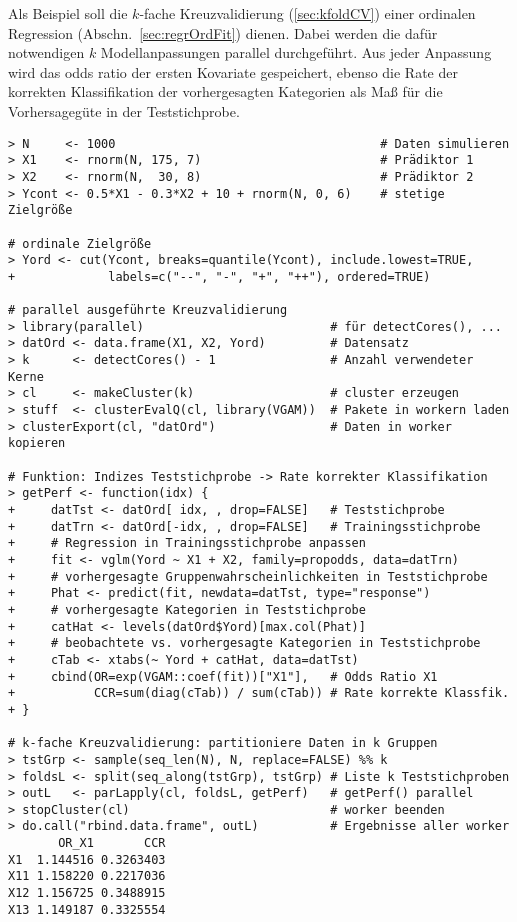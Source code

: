 Als Beispiel soll die $k$-fache Kreuzvalidierung (\ref{sec:kfoldCV}) einer ordinalen Regression (Abschn.\ \ref{sec:regrOrdFit}) dienen. Dabei werden die dafür notwendigen $k$ Modellanpassungen parallel durchgeführt. Aus jeder Anpassung wird das odds ratio der ersten Kovariate gespeichert, ebenso die Rate der korrekten Klassifikation der vorhergesagten Kategorien als Maß für die Vorhersagegüte in der Teststichprobe.
\begin{lstlisting}
> N     <- 1000                                     # Daten simulieren
> X1    <- rnorm(N, 175, 7)                         # Prädiktor 1
> X2    <- rnorm(N,  30, 8)                         # Prädiktor 2
> Ycont <- 0.5*X1 - 0.3*X2 + 10 + rnorm(N, 0, 6)    # stetige Zielgröße

# ordinale Zielgröße
> Yord <- cut(Ycont, breaks=quantile(Ycont), include.lowest=TRUE,
+             labels=c("--", "-", "+", "++"), ordered=TRUE)

# parallel ausgeführte Kreuzvalidierung
> library(parallel)                          # für detectCores(), ...
> datOrd <- data.frame(X1, X2, Yord)         # Datensatz
> k      <- detectCores() - 1                # Anzahl verwendeter Kerne
> cl     <- makeCluster(k)                   # cluster erzeugen
> stuff  <- clusterEvalQ(cl, library(VGAM))  # Pakete in workern laden
> clusterExport(cl, "datOrd")                # Daten in worker kopieren

# Funktion: Indizes Teststichprobe -> Rate korrekter Klassifikation
> getPerf <- function(idx) {
+     datTst <- datOrd[ idx, , drop=FALSE]   # Teststichprobe
+     datTrn <- datOrd[-idx, , drop=FALSE]   # Trainingsstichprobe
+     # Regression in Trainingsstichprobe anpassen
+     fit <- vglm(Yord ~ X1 + X2, family=propodds, data=datTrn)
+     # vorhergesagte Gruppenwahrscheinlichkeiten in Teststichprobe
+     Phat <- predict(fit, newdata=datTst, type="response")
+     # vorhergesagte Kategorien in Teststichprobe
+     catHat <- levels(datOrd$Yord)[max.col(Phat)]
+     # beobachtete vs. vorhergesagte Kategorien in Teststichprobe
+     cTab <- xtabs(~ Yord + catHat, data=datTst)
+     cbind(OR=exp(VGAM::coef(fit))["X1"],   # Odds Ratio X1
+           CCR=sum(diag(cTab)) / sum(cTab)) # Rate korrekte Klassfik.
+ }

# k-fache Kreuzvalidierung: partitioniere Daten in k Gruppen
> tstGrp <- sample(seq_len(N), N, replace=FALSE) %% k
> foldsL <- split(seq_along(tstGrp), tstGrp) # Liste k Teststichproben
> outL   <- parLapply(cl, foldsL, getPerf)   # getPerf() parallel
> stopCluster(cl)                            # worker beenden
> do.call("rbind.data.frame", outL)          # Ergebnisse aller worker
       OR_X1       CCR
X1  1.144516 0.3263403
X11 1.158220 0.2217036
X12 1.156725 0.3488915
X13 1.149187 0.3325554
\end{lstlisting}

